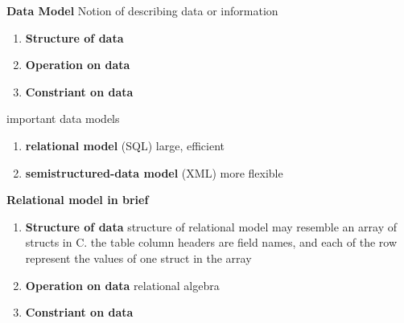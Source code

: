 \documentclass[11pt]{article}
\begin{document}
\begin{defn*}
    \textbf{Data Model} Notion of describing data or information 
    \begin{enumerate}
        \item \textbf{Structure of data} 
        \item \textbf{Operation on data} 
        \item \textbf{Constriant on data}
    \end{enumerate}
    important data models 
    \begin{enumerate}
        \item \textbf{relational model} (SQL) large, efficient
        \item \textbf{semistructured-data model} (XML) more flexible
    \end{enumerate}
\end{defn*}


\begin{defn*} 
    \textbf{Relational model in brief} 
    \begin{enumerate}
        \item \textbf{Structure of data} structure of relational model may resemble an array of structs in C. the table column headers are field names, and each of the row represent the values of one struct in the array
        \item \textbf{Operation on data} relational algebra
        \item \textbf{Constriant on data} 
    \end{enumerate}
\end{defn*}
\end{document}
